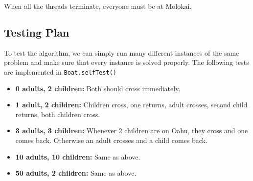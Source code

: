 \documentclass{article}
\begin{document}
When all the threads terminate, everyone must be at Molokai.

\subsection{Testing Plan}

To test the algorithm, we can simply run many different instances of the same problem and make sure that every instance is solved properly. The following tests are implemented in \texttt{Boat.selfTest()}
\begin{itemize}
\item \textbf{0 adults, 2 children:} Both should cross immediately.
\item \textbf{1 adult, 2 children:} Children cross, one returns, adult crosses, second child returns, both children cross.
\item \textbf{3 adults, 3 children:} Whenever 2 children are on Oahu, they cross and one comes back. Otherwise an adult crosses and a child comes back.
\item \textbf{10 adults, 10 children:} Same as above.
\item \textbf{50 adults, 2 children:} Same as above.
\end{itemize}
\end{document}
